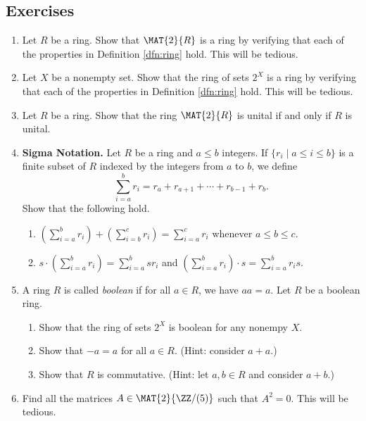 \documentclass{article}
\begin{document}
\subsection*{Exercises}

\begin{enumerate}
\item Let $R$ be a ring. Show that $\MAT{2}{R}$ is a ring by verifying that each of the properties in Definition \ref{dfn:ring} hold. This will be tedious.

\item Let $X$ be a nonempty set. Show that the ring of sets $2^X$ is a ring by verifying that each of the properties in Definition \ref{dfn:ring} hold. This will be tedious.

\item Let $R$ be a ring. Show that the ring $\MAT{2}{R}$ is unital if and only if $R$ is unital.

\item \textbf{Sigma Notation.} Let $R$ be a ring and $a \leq b$ integers. If $\{ r_i \mid a \leq i \leq b \}$ is a finite subset of $R$ indexed by the integers from $a$ to $b$, we define \[ \sum_{i=a}^b r_i = r_a + r_{a+1} + \cdots + r_{b-1} + r_b. \] Show that the following hold.
\begin{enumerate}
\item $\left( \sum_{i=a}^b r_i \right) + \left( \sum_{i=b}^c r_i \right) = \sum_{i=a}^c r_i$ whenever $a \leq b \leq c$.
\item $s \cdot \left( \sum_{i=a}^b r_i \right) = \sum_{i=a}^b sr_i$ and $\left( \sum_{i=a}^b r_i \right) \cdot s = \sum_{i=a}^b r_i s$.
\end{enumerate}

\item A ring $R$ is called \emph{boolean} if for all $a \in R$, we have $aa = a$. Let $R$ be a boolean ring.
\begin{enumerate}
\item Show that the ring of sets $2^X$ is boolean for any nonempy $X$.
\item Show that $-a = a$ for all $a \in R$. (Hint: consider $a+a$.)
\item Show that $R$ is commutative. (Hint: let $a,b \in R$ and consider $a+b$.)
\end{enumerate}

\item Find all the matrices $A \in \MAT{2}{\ZZ/(5)}$ such that $A^2 = 0$. This will be tedious.
\end{enumerate}
\end{document}
